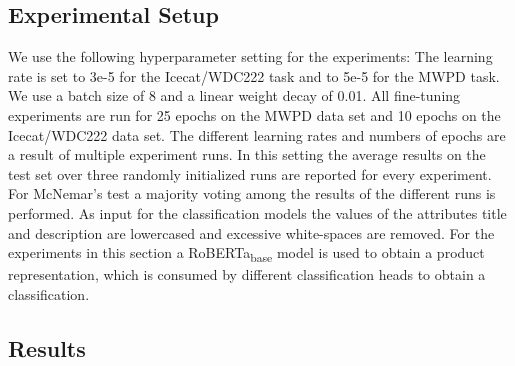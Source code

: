 \documentclass[11pt,dvipdfm]{article}
\begin{document}
\subsection{Experimental Setup}

We use the following hyperparameter setting for the experiments: 
The learning rate is set to 3e-5 for the Icecat/WDC222 task and to 5e-5 for the \ac{MWPD} task.
We use a batch size of 8 and a linear weight decay of 0.01.
All fine-tuning experiments are run for 25 epochs on the \ac{MWPD} data set and 10 epochs on the Icecat/WDC222 data set.
The different learning rates and numbers of epochs are a result of multiple experiment runs.
In this setting the average results on the test set over three randomly initialized runs are reported for every experiment.
For McNemar's test a majority voting among the results of the different runs is performed.
As input for the classification models the values of the attributes title and description are lowercased and excessive white-spaces are removed.
For the experiments in this section a RoBERTa\textsubscript{base} model is used to obtain a product representation, which is consumed by different classification heads to obtain a classification.

\subsection{Results}
\end{document}
